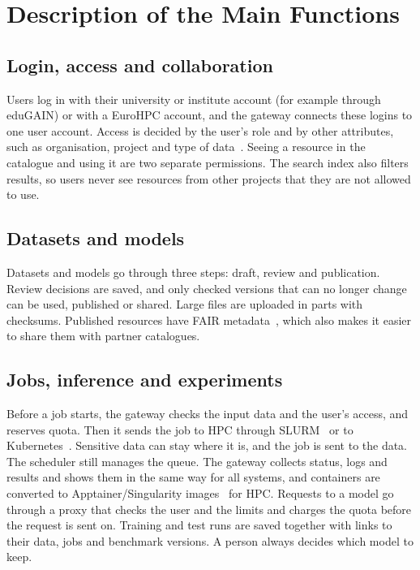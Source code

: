 \documentclass[conference,a4paper]{IEEEtran}
\begin{document}
\section{Description of the Main Functions}

\subsection{Login, access and collaboration}
Users log in with their university or institute account (for example through eduGAIN) or with a EuroHPC account, and the gateway connects these logins to one user account. Access is decided by the user's role and by other attributes, such as organisation, project and type of data~\cite{nist_abac}. Seeing a resource in the catalogue and using it are two separate permissions. The search index also filters results, so users never see resources from other projects that they are not allowed to use.

\subsection{Datasets and models}
Datasets and models go through three steps: draft, review and publication. Review decisions are saved, and only checked versions that can no longer change can be used, published or shared. Large files are uploaded in parts with checksums. Published resources have FAIR metadata~\cite{wilkinson2016fair}, which also makes it easier to share them with partner catalogues.

\subsection{Jobs, inference and experiments}
Before a job starts, the gateway checks the input data and the user's access, and reserves quota. Then it sends the job to HPC through SLURM~\cite{yoo2003slurm} or to Kubernetes~\cite{burns2016borg}. Sensitive data can stay where it is, and the job is sent to the data. The scheduler still manages the queue. The gateway collects status, logs and results and shows them in the same way for all systems, and containers are converted to Apptainer/Singularity images~\cite{kurtzer2017singularity} for HPC. Requests to a model go through a proxy that checks the user and the limits and charges the quota before the request is sent on. Training and test runs are saved together with links to their data, jobs and benchmark versions. A person always decides which model to keep.
\end{document}
